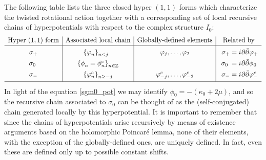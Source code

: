\documentclass[11pt]{amsart}
\theoremstyle{remark}
\theoremstyle{remark}
\theoremstyle{definition}
\theoremstyle{definition}
\theoremstyle{definition}
\newcommand{\0}{{\scriptstyle 0'}} %
\newcommand{\1}{{\scriptstyle 1'}}
\newcommand{\hp}{\hspace{0.5pt}} %
\begin{document}
The following table lists the three closed hyper $(1,1)$ forms which characterize the twisted rotational action together with a corresponding set of local recursive chains of hyperpotentials with respect to the complex structure $I_0$: 
\begin{equation*}
\begin{array}{c|c|c|c}
\text{Hyper $(1,1)$ form} & \text{Associated local chain}  &  \text{Globally-defined elements} & \text{Related by} \\[1pt] \hline
\rule[13pt]{0pt}{0pt}
\sigma_+  & \{\varphi^{\phantom{c}}_n\}^{\phantom{c}}_{n \leq j\phantom{+}} & \varphi_{j}, \dots, \varphi_2  & \ \sigma_+ = i \hp \partial\bar{\partial} \varphi_+  \\[4pt]
\sigma_0\phantom{\hspace{2.7pt}} & \{\phi^{\phantom{c}}_n = \phi^c_n\}^{\phantom{c}}_{n \in \mathbb{Z}} & & \ \hspace{-2.7pt} \sigma_0 \hspace{2.5pt} = i \hp \partial\bar{\partial} \phi_{\hp 0} \\[4pt]
\sigma_- 	& \{\varphi^c_n\}^{\phantom{c}}_{n \geq -j} & \varphi^c_{-j}, \dots, \varphi^c_{-2} & \ \sigma_- = i \hp \partial\bar{\partial} \varphi^c_- \\[4pt] \hline
\end{array}
\vspace{2.5pt}
\end{equation*}
In light of the equation \eqref{sgm0_pot} we may identify $\phi_0 = - (\kappa_0 + 2\mu)$, and so the recursive chain associated to $\sigma_0$ can be thought of as the (self-conjugated) chain generated locally by this hyperpotential. It is important to remember that since the chains of hyperpotentials arise recursively by means of existence arguments based on the holomorphic Poincar\'e lemma, none of their elements, with the exception of the globally-defined ones, are uniquely defined. In fact, even these are defined only up to possible constant shifts. 
\end{document}
